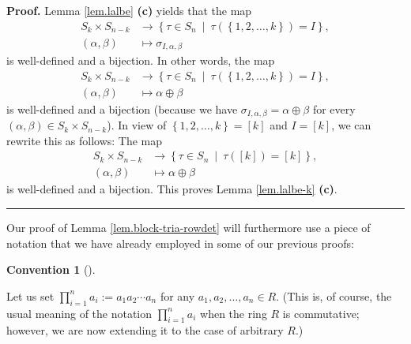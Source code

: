 \documentclass
[numbers=enddot,12pt,final,onecolumn,notitlepage,english]{scrartcl}%
\theoremstyle{definition}
\newtheorem{conv}[theo]{Convention}
\newenvironment{convention}[1][]
{\begin{conv}[#1]\begin{leftbar}}
{\end{leftbar}\end{conv}}
\newenvironment{proof}[1][Proof]{\noindent\textbf{#1.} }{\ \rule{0.5em}{0.5em}}
\let\prodnonlimits\prod
\renewcommand{\prod}{\prodnonlimits\limits}
\newenvironment{verlong}{}{}
\begin{document}
\begin{verlong}
\begin{proof}
Lemma \ref{lem.lalbe} \textbf{(c)} yields that the map
\begin{align*}
S_{k}\times S_{n-k}  &  \rightarrow\left\{  \tau\in S_{n}\ \mid\ \tau\left(
\left\{  1,2,\ldots,k\right\}  \right)  =I\right\}  ,\\
\left(  \alpha,\beta\right)   &  \mapsto\sigma_{I,\alpha,\beta}%
\end{align*}
is well-defined and a bijection. In other words, the map%
\begin{align*}
S_{k}\times S_{n-k}  &  \rightarrow\left\{  \tau\in S_{n}\ \mid\ \tau\left(
\left\{  1,2,\ldots,k\right\}  \right)  =I\right\}  ,\\
\left(  \alpha,\beta\right)   &  \mapsto\alpha\oplus\beta
\end{align*}
is well-defined and a bijection (because we have $\sigma_{I,\alpha,\beta
}=\alpha\oplus\beta$ for every $\left(  \alpha,\beta\right)  \in S_{k}\times
S_{n-k}$). In view of $\left\{  1,2,\ldots,k\right\}  =\left[  k\right]  $ and
$I=\left[  k\right]  $, we can rewrite this as follows: The map%
\begin{align*}
S_{k}\times S_{n-k}  &  \rightarrow\left\{  \tau\in S_{n}\ \mid\ \tau\left(
\left[  k\right]  \right)  =\left[  k\right]  \right\}  ,\\
\left(  \alpha,\beta\right)   &  \mapsto\alpha\oplus\beta
\end{align*}
is well-defined and a bijection. This proves Lemma \ref{lem.lalbe-k}
\textbf{(c)}.
\end{proof}

Our proof of Lemma \ref{lem.block-tria-rowdet} will furthermore use a piece of
notation that we have already employed in some of our previous proofs:

\begin{convention}
\label{conv.prod-noncomm}Let us set $\prod_{i=1}^{n}a_{i}:=a_{1}a_{2}\cdots
a_{n}$ for any $a_{1},a_{2},\ldots,a_{n}\in R$. (This is, of course, the usual
meaning of the notation $\prod_{i=1}^{n}a_{i}$ when the ring $R$ is
commutative; however, we are now extending it to the case of arbitrary $R$.)
\end{convention}


\end{verlong}
\end{document}
